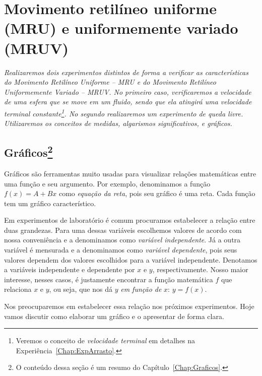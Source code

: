 \chapter{Movimento retilíneo uniforme (MRU) e uniformemente variado (MRUV)}
\label{Chap:ExpMRUMRUV}

\begin{fullwidth}\it
	Realizaremos dois experimentos distintos de forma a verificar as características do Movimento Retilíneo Uniforme -- MRU e do Movimento Retilíneo Uniformemente Variado -- MRUV. No primeiro caso, verificaremos a velocidade de uma esfera que se move em um fluido, sendo que ela atingirá uma velocidade terminal constante\footnote[][15mm]{Veremos o conceito de \emph{velocidade terminal} em detalhes na Experiência~\ref{Chap:ExpArrasto}.}. No segundo realizaremos um experimento de queda livre. Utilizaremos os conceitos de medidas, algarismos significativos, e gráficos.
\end{fullwidth}

\section[Gráficos]{Gráficos\footnote{O conteúdo dessa seção é um resumo do Capítulo~\ref{Chap:Graficos}.}}

Gráficos são ferramentas muito usadas para visualizar relações matemáticas entre uma função e seu argumento. Por exemplo, denominamos a função $f(x) = A + Bx$ como \emph{equação da reta}, pois seu gráfico é uma reta. Cada função tem um gráfico característico. 

Em experimentos de laboratório é comum procuramos estabelecer a relação entre duas grandezas. Para uma dessas variáveis escolhemos valores de acordo com nossa conveniência e a denominamos como \emph{variável independente}. Já a outra variável é mensurada e a denominamos como \emph{variável dependente}, pois seus valores dependem dos valores escolhidos para a variável independente. Denotamos a variáveis independente e dependente por $x$ e $y$, respectivamente. Nosso maior interesse, nesses casos, é justamente encontrar a função matemática $f$ que relaciona $x$ e $y$, ou seja, que nos dá $y$ \emph{em função de} $x$: $y = f(x)$.

Nos preocuparemos em estabelecer essa relação nos próximos experimentos. Hoje vamos discutir como elaborar um gráfico e o apresentar de forma clara.

